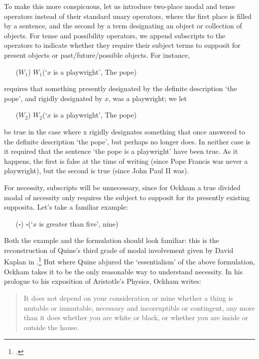 \documentclass[a4paper]{article}
\begin{document}
To make this more conspicuous, let us introduce two-place modal and tense operators instead of their standard unary operators, where the first place is filled by a sentence, and the second by a term designating an object or collection of objects. For tense and possibility operators, we append subscripts to the operators to indicate whether they require their subject terms to supposit for present objects or past/future/possible objects. For instance, 

\begin{enumerate}
	\item[($W_{1}$)] $W_{1}$(`$x$ is a playwright', The pope)
\end{enumerate}

\noindent requires that something presently designated by the definite description `the pope', and rigidly designated by $x$, was a playwright; we let

\begin{enumerate}
	\item[($W_{2}$)] $W_{2}$(`$x$ is a playwright', The pope)
\end{enumerate}

\noindent be true in the case where x rigidly designates something that once answered to the definite description `the pope', but perhaps no longer does. In neither case is it required that the sentence `the pope is a playwright' have been true. As it happens, the first is false at the time of writing (since Pope Francis was never a playwright), but the second is true (since John Paul II was).

For necessity, subscripts will be unnecessary, since for Ockham a true divided modal of necessity only requires the subject to supposit for its presently existing supposita. Let's take a familiar example:
\begin{enumerate}
	\item[($\square$)] $\square$(`$x$ is greater than five', nine)
\end{enumerate}

Both the example and the formulation should look familiar: this is the reconstruction of Quine's third grade of modal involvement given by David Kaplan in \cite{Kaplan1968}.\footnote{\cite{Quine1976}.} But where Quine abjured the `essentialism' of the above formulation, Ockham takes it to be the only reasonable way to understand necessity. In his prologue to his exposition of Aristotle's Physics, Ockham writes: 

\begin{quote}
It does not depend on your consideration or mine whether a thing is mutable or immutable, necessary and incorruptible or contingent, any more than it does whether you are white or black, or whether you are inside or outside the house. \cite[p. 14, alt.]{Ockham1957}
\end{quote}
\end{document}
